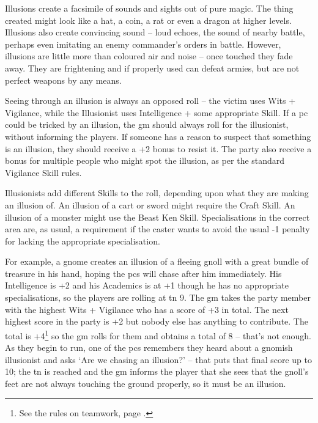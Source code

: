 \begin{multicols}{2}

\noindent
Illusions create a facsimile of sounds and sights out of pure magic. The thing created might look like a hat, a coin, a rat or even a dragon at higher levels. Illusions also create convincing sound -- loud echoes, the sound of nearby battle, perhaps even imitating an enemy commander's orders in battle. However, illusions are little more than coloured air and noise -- once touched they fade away. They are frightening and if properly used can defeat armies, but are not perfect weapons by any means.

Seeing through an illusion is always an opposed roll -- the victim uses Wits + Vigilance, while the Illusionist uses Intelligence + some appropriate Skill.
If a \gls{pc} could be tricked by an illusion, the \gls{gm} should always roll for the illusionist, without informing the players.
If someone has a reason to suspect that something is an illusion, they should receive a +2 bonus to resist it.
The party also receive a bonus for multiple people who might spot the illusion, as per the standard Vigilance Skill rules.

Illusionists add different Skills to the roll, depending upon what they are making an illusion of.
An illusion of a cart or sword might require the Craft Skill.
An illusion of a monster might use the Beast Ken Skill.
Specialisations in the correct area are, as usual, a requirement if the caster wants to avoid the usual -1 penalty for lacking the appropriate specialisation.

For example, a gnome creates an illusion of a fleeing gnoll with a great bundle of treasure in his hand, hoping the \glspl{pc} will chase after him immediately.
His Intelligence is +2 and his Academics is at +1 though he has no appropriate specialisations, so the players are rolling at \gls{tn} 9.
The \gls{gm} takes the party member with the highest Wits + Vigilance who has a score of +3 in total.
The next highest score in the party is +2 but nobody else has anything to contribute.
The total is +4\footnote{See the rules on teamwork, page \pageref{teamwork}.} so the \gls{gm} rolls for them and obtains a total of 8 -- that's not enough.
As they begin to run, one of the \glspl{pc} remembers they heard about a gnomish illusionist and asks `Are we chasing an illusion?' -- that puts that final score up to 10; the \gls{tn} is reached and the \gls{gm} informs the player that she sees that the gnoll's feet are not always touching the ground properly, so it must be an illusion.


\end{multicols}
